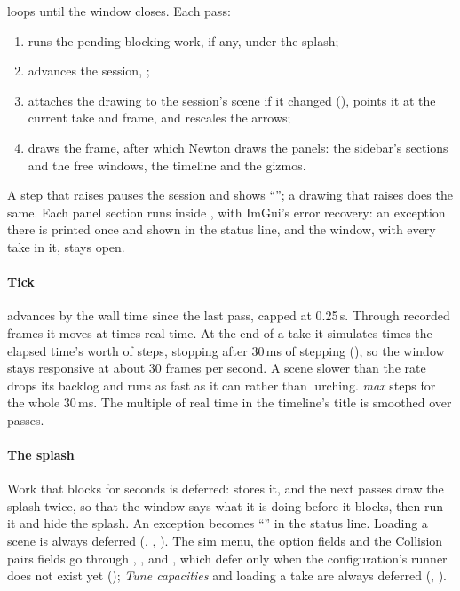  loops until the window closes. Each pass:

\begin{enumerate}
\item runs the pending blocking work, if any, under the splash;
\item advances the session, ;
\item attaches the drawing to the session's scene if it changed (), points it at the current take and frame, and rescales the arrows;
\item draws the frame, after which Newton draws the panels: the sidebar's sections and the free windows, the timeline and the gizmos.
\end{enumerate}

A step that raises pauses the session and shows ``''; a drawing that raises does the same. Each panel section runs inside , with ImGui's error recovery: an exception there is printed once and shown in the status line, and the window, with every take in it, stays open.

\paragraph{Tick}  advances by the wall time since the last pass, capped at 0.25\,s. Through recorded frames it moves at  times real time. At the end of a take it simulates  times the elapsed time's worth of steps, stopping after 30\,ms of stepping (), so the window stays responsive at about 30 frames per second. A scene slower than the rate drops its backlog and runs as fast as it can rather than lurching. \emph{max} steps for the whole 30\,ms. The multiple of real time in the timeline's title is smoothed over passes.

\paragraph{The splash} Work that blocks for seconds is deferred:  stores it, and the next passes draw the splash twice, so that the window says what it is doing before it blocks, then run it and hide the splash. An exception becomes ``'' in the status line. Loading a scene is always deferred (, , ). The sim menu, the option fields and the Collision pairs fields go through , ,  and , which defer only when the configuration's runner does not exist yet (); \emph{Tune capacities} and loading a take are always deferred (, ).

